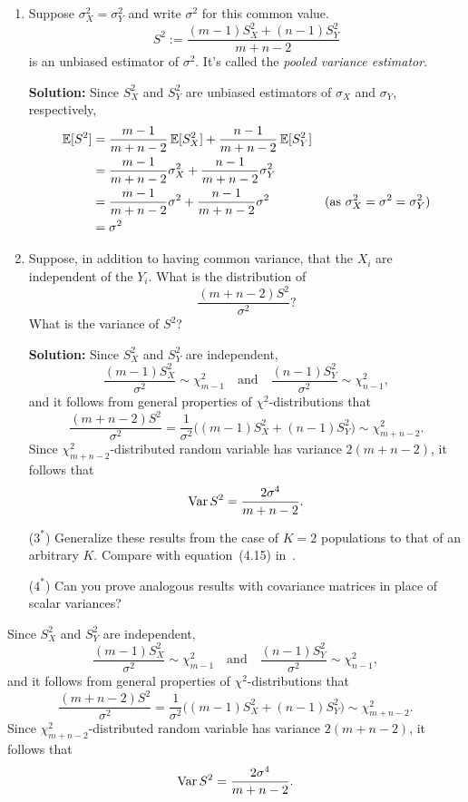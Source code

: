 \documentclass[12pt]{amsart}
\newcommand{\sol}{\bigskip\noindent\textbf{Solution: }}
\begin{document}
\begin{enumerate}\setlength\itemsep{1em}
\item Suppose $\sigma_X^2 = \sigma_Y^2$ and write $\sigma^2$ for this common value.
\[
    S^2 := \frac{(m-1)S_X^2 + (n-1)S_Y^2}{m + n - 2}
\]
is an unbiased estimator of $\sigma^2$. It's called the \emph{pooled variance estimator}.

\sol
Since $S_X^2$ and $S_Y^2$ are unbiased estimators of $\sigma_X$ and $\sigma_Y$, respectively,
\begin{align*}
    \operatorname{\mathbb{E}}[S^2] &= \frac{m-1}{m + n - 2}\operatorname{\mathbb{E}}[S_X^2] + \frac{n-1}{m+n-2}\operatorname{\mathbb{E}}[S_Y^2]\\
    &= \frac{m-1}{m + n - 2}\sigma_X^2 + \frac{n-1}{m+n-2}\sigma_Y^2\\
    &= \frac{m-1}{m + n - 2}\sigma^2 + \frac{n-1}{m+n-2}\sigma^2&\text{(as $\sigma_X^2 = \sigma^2 = \sigma_Y^2$)}\\
    &= \sigma^2
\end{align*}


\item Suppose, in addition to having common variance,
that the $X_i$ are independent of the $Y_i$.
What is the distribution of
\[
\frac{(m+n-2)S^2}{\sigma^2}?
\]
What is the variance of $S^2$?

\sol
Since $S_X^2$ and $S_Y^2$ are independent,
\[
    \frac{(m-1)S_X^2}{\sigma^2}\sim \chi^2_{m-1}
    \quad\text{and}\quad
    \frac{(n-1)S_Y^2}{\sigma^2}\sim \chi^2_{n-1},
\]
and it follows from general properties of $\chi^2$-distributions that
\[
    \frac{(m+n-2)S^2}{\sigma^2}
    = \frac1{\sigma^2}\big((m-1)S_X^2 + (n-1)S_Y^2\big)\sim \chi^2_{m+n-2}.
\]
Since $ \chi^2_{m+n-2}$-distributed random variable has variance $2(m+n-2)$, it follows that
\[
    \operatorname{Var} S^2 = \frac{2\sigma^4}{m+n-2}.
\]


\item[($3^*$)] Generalize these results from the case of $K=2$ populations to that of an arbitrary $K$.
Compare with equation~(4.15) in~\cite{ISLR}.

\item[($4^*$)] Can you prove analogous results with covariance matrices in place of scalar variances?
\end{enumerate}




Since $S_X^2$ and $S_Y^2$ are independent,
\[
    \frac{(m-1)S_X^2}{\sigma^2}\sim \chi^2_{m-1}
    \quad\text{and}\quad
    \frac{(n-1)S_Y^2}{\sigma^2}\sim \chi^2_{n-1},
\]
and it follows from general properties of $\chi^2$-distributions that
\[
    \frac{(m+n-2)S^2}{\sigma^2}
    = \frac1{\sigma^2}\big((m-1)S_X^2 + (n-1)S_Y^2\big)\sim \chi^2_{m+n-2}.
\]
Since $ \chi^2_{m+n-2}$-distributed random variable has variance $2(m+n-2)$, it follows that
\[
    \operatorname{Var} S^2 = \frac{2\sigma^4}{m+n-2}.
\]
\end{document}
